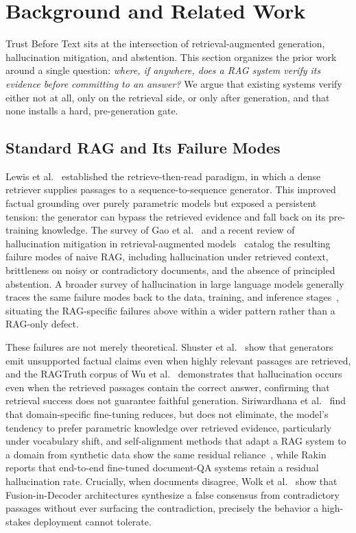 \documentclass[conference]{IEEEtran}
\begin{document}
\section{Background and Related Work}
\label{sec:related}

Trust Before Text sits at the intersection of retrieval-augmented
generation, hallucination mitigation, and abstention. This section
organizes the prior work around a single question: \textit{where, if
anywhere, does a RAG system verify its evidence before committing to an
answer?} We argue that existing systems verify either not at all, only on
the retrieval side, or only after generation, and that none installs a
hard, pre-generation gate.

\subsection{Standard RAG and Its Failure Modes}
Lewis et al.~\cite{lewis2020rag} established the retrieve-then-read
paradigm, in which a dense retriever supplies passages to a
sequence-to-sequence generator. This improved factual grounding over
purely parametric models but exposed a persistent tension: the generator
can bypass the retrieved evidence and fall back on its pre-training
knowledge. The survey of Gao et al.~\cite{gao2023rag_survey} and a recent
review of hallucination mitigation in retrieval-augmented
models~\cite{zhang2025review} catalog the resulting failure modes of naive
RAG, including hallucination under retrieved context, brittleness on noisy
or contradictory documents, and the absence of principled abstention. A
broader survey of hallucination in large language models generally traces
the same failure modes back to the data, training, and inference
stages~\cite{huang2025hallucination}, situating the RAG-specific failures
above within a wider pattern rather than a RAG-only defect.

These failures are not merely theoretical. Shuster et
al.~\cite{shuster2021retrieval} show that generators emit unsupported
factual claims even when highly relevant passages are retrieved, and the
RAGTruth corpus of Wu et al.~\cite{wu2024ragtruth} demonstrates that
hallucination occurs even when the retrieved passages contain the correct
answer, confirming that retrieval success does not guarantee faithful
generation. Siriwardhana et al.~\cite{siriwardhana2023rag} find that
domain-specific fine-tuning reduces, but does not eliminate, the model's
tendency to prefer parametric knowledge over retrieved evidence,
particularly under vocabulary shift, and self-alignment methods that adapt a
RAG system to a domain from synthetic data show the same residual
reliance~\cite{mao2024ragstudio}, while Rakin~\cite{rakin2024rag}
reports that end-to-end fine-tuned document-QA systems retain a residual
hallucination rate. Crucially, when documents disagree, Wolk et
al.~\cite{wolk2025clinical} show that Fusion-in-Decoder architectures
synthesize a false consensus from contradictory passages without ever
surfacing the contradiction, precisely the behavior a high-stakes
deployment cannot tolerate.
\end{document}
